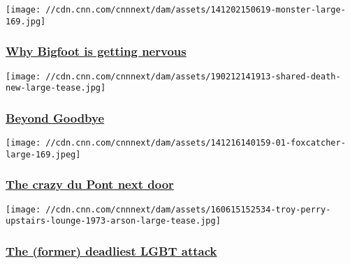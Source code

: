 \href{http://www.cnn.com/interactive/2014/10/us/monsters-in-america/}{}

\texttt{[image: //cdn.cnn.com/cnnnext/dam/assets/141202150619-monster-large-169.jpg]}

\hypertarget{why-bigfoot-is-getting-nervous}{%
\subsubsection{\texorpdfstring{\href{http://www.cnn.com/interactive/2014/10/us/monsters-in-america/}{Why
Bigfoot is getting
nervous}}{Why Bigfoot is getting nervous}}\label{why-bigfoot-is-getting-nervous}}

\href{http://www.cnn.com/interactive/2014/12/us/shared-death/}{}

\texttt{[image: //cdn.cnn.com/cnnnext/dam/assets/190212141913-shared-death-new-large-tease.jpg]}

\hypertarget{beyond-goodbye}{%
\subsubsection{\texorpdfstring{\href{http://www.cnn.com/interactive/2014/12/us/shared-death/}{Beyond
Goodbye}}{Beyond Goodbye}}\label{beyond-goodbye}}

\href{/2014/12/19/showbiz/foxcatcher-steve-carell-du-pont/index.html}{}

\texttt{[image: //cdn.cnn.com/cnnnext/dam/assets/141216140159-01-foxcatcher-large-169.jpeg]}

\hypertarget{the-crazy-du-pont-next-door-}{%
\subsubsection{\texorpdfstring{\href{/2014/12/19/showbiz/foxcatcher-steve-carell-du-pont/index.html}{The
crazy du Pont next door
}}{The crazy du Pont next door }}\label{the-crazy-du-pont-next-door-}}

\href{/2016/06/16/health/1973-new-orleans-gay-bar-arson-attack/index.html}{}

\texttt{[image: //cdn.cnn.com/cnnnext/dam/assets/160615152534-troy-perry-upstairs-lounge-1973-arson-large-tease.jpg]}

\hypertarget{the-former-deadliest-lgbt-attack}{%
\subsubsection{\texorpdfstring{\href{/2016/06/16/health/1973-new-orleans-gay-bar-arson-attack/index.html}{The
(former) deadliest LGBT
attack}}{The (former) deadliest LGBT attack}}\label{the-former-deadliest-lgbt-attack}}

